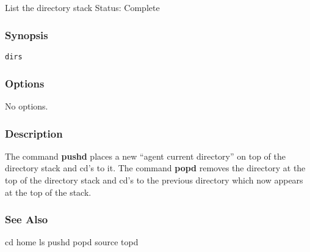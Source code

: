 \subsection{}
\label{dirs}
List the directory stack 
 Status: Complete
\subsubsection*{Synopsis}
\begin{verbatim}
dirs
\end{verbatim}
\subsubsection*{Options}
 No options. 
\subsubsection*{Description}
 The command \textbf{pushd}
 places a new ``agent current directory'' on top of the directory stack and cd's to it. The command \textbf{popd}
 removes the directory at the top of the directory stack and cd's to the previous directory which now appears at the top of the stack. 
\subsubsection*{See Also}
 cd home ls pushd popd source topd
